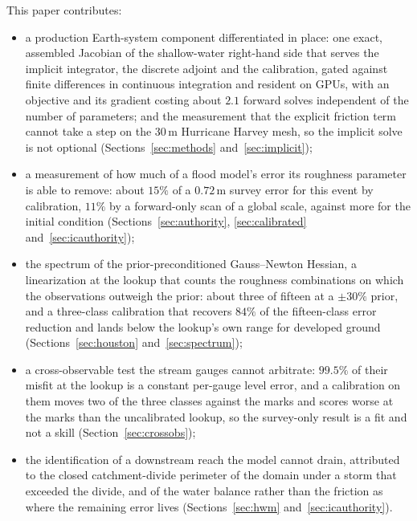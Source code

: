 \documentclass[11pt]{article}
\begin{document}
This paper contributes:
\begin{itemize}
  \item a production Earth-system component differentiated in place:
        one exact, assembled Jacobian of the shallow-water right-hand
        side that serves the implicit integrator, the discrete
        adjoint and the calibration, gated against finite differences
        in continuous integration and resident on GPUs, with an
        objective and its gradient costing about $2.1$ forward solves
        independent of the number of parameters; and the measurement
        that the explicit friction term cannot take a step on the
        30\,m Hurricane Harvey mesh, so the implicit solve is not
        optional (Sections~\ref{sec:methods} and~\ref{sec:implicit});
  \item a measurement of how much of a flood model's error its
        roughness parameter is able to remove: about $15\%$ of a
        $0.72$\,m survey error for this event by calibration, $11\%$ by
        a forward-only scan of a global scale, against more for the
        initial condition (Sections~\ref{sec:authority},
        \ref{sec:calibrated} and~\ref{sec:icauthority});
  \item the spectrum of the prior-preconditioned Gauss--Newton
        Hessian, a linearization at the lookup that counts the
        roughness combinations on which the observations outweigh the
        prior: about three of fifteen at a $\pm 30\%$ prior, and a
        three-class calibration that recovers $84\%$ of the
        fifteen-class error reduction and lands below the lookup's own
        range for developed ground
        (Sections~\ref{sec:houston} and~\ref{sec:spectrum});
  \item a cross-observable test the stream gauges cannot arbitrate:
        $99.5\%$ of their misfit at the lookup is a constant per-gauge
        level error, and a calibration on them moves two of the three
        classes against the marks and scores worse at the marks than the
        uncalibrated lookup, so the survey-only result is a fit and
        not a skill (Section~\ref{sec:crossobs});
  \item the identification of a downstream reach the model cannot
        drain, attributed to the closed catchment-divide perimeter of
        the domain under a storm that exceeded the divide, and of the
        water balance rather than the friction as where the remaining
        error lives (Sections~\ref{sec:hwm} and~\ref{sec:icauthority}).
\end{itemize}
\end{document}
